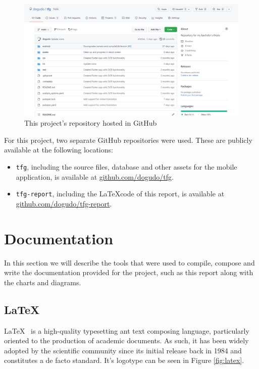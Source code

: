 \begin{figure}[h]
  \centering
  \includegraphics[width=\textwidth]{Figures/github-repo.png}
  \caption{%
    This project's repository hosted in GitHub
  }
  \label{fig:github-repo}
\end{figure}

For this project, two separate GitHub repositories were used. These are publicly available at the following locations:

\begin{itemize}
\item \texttt{tfg}, including the source files, database and other assets for the mobile application, is available at \url{github.com/dogudo/tfg}.
\item \texttt{tfg-report}, including the \LaTeX code of this report, is available at \url{github.com/dogudo/tfg-report}.
\end{itemize}

\section{Documentation}

In this section we will describe the tools that were used to compile, compose and write the documentation provided for the project, such as this report along with the charts and diagrams.

\subsection{\LaTeX}

\LaTeX\ \cite{noauthor_latex_nodate} is a high-quality typesetting ant text composing language, particularly oriented to the production of academic documents. As such, it has been widely adopted by the scientific community since its initial release back in 1984 and constitutes a de facto standard. It's logotype can be seen in Figure \ref{fig:latex}.

